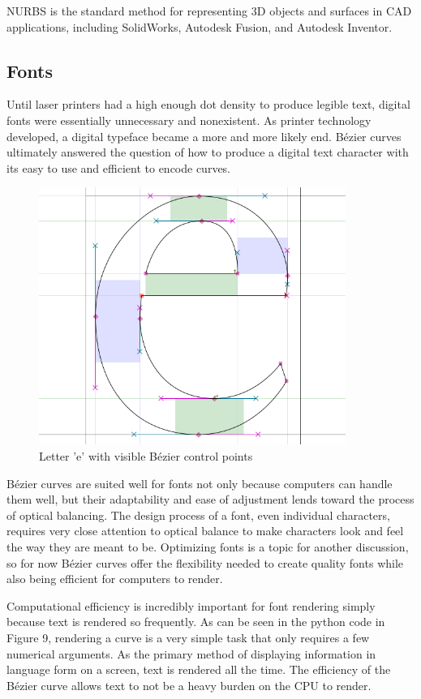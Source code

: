 \documentclass[12pt,letterpaper]{article}
\begin{document}
NURBS is the standard method for representing 3D objects and surfaces in CAD applications, including SolidWorks, Autodesk Fusion, and Autodesk Inventor. 

\subsection{Fonts}

Until laser printers had a high enough dot density to produce legible text, digital fonts were essentially unnecessary and nonexistent. As printer technology developed, a digital typeface became a more and more likely end. B\'ezier curves ultimately answered the question of how to produce a digital text character with its easy to use and efficient to encode curves.

\begin{figure}[H]
    \centering
    \includegraphics[width=10cm]{char}
    \caption{Letter 'e' with visible B\'ezier control points}
\end{figure}

B\'ezier curves are suited well for fonts not only because computers can handle them well, but their adaptability and ease of adjustment lends toward the process of optical balancing. The design process of a font, even individual characters, requires very close attention to optical balance to make characters look and feel the way they are meant to be. Optimizing fonts is a topic for another discussion, so for now B\'ezier curves offer the flexibility needed to create quality fonts while also being efficient for computers to render. 

Computational efficiency is incredibly important for font rendering simply because text is rendered so frequently. As can be seen in the python code in Figure 9, rendering a curve is a very simple task that only requires a few numerical arguments. As the primary method of displaying information in language form on a screen, text is rendered all the time. The efficiency of the B\'ezier curve allows text to not be a heavy burden on the CPU to render. 
\end{document}
